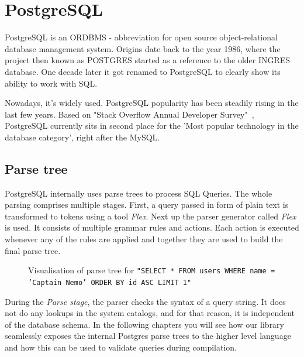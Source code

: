 \section{PostgreSQL}
PostgreSQL is an ORDBMS - abbreviation for open source object-relational database management system. Origins date back to the year 1986, where the project then known as POSTGRES started as a reference to the older INGRES database. One decade later it got renamed to PostgreSQL to clearly show its ability to work with SQL.\cite{PostgreSQL} 

Nowadays, it's widely used. PostgreSQL popularity has been steadily rising in the last few years. Based on "Stack Overflow Annual Developer Survey"~\cite{Stackoverflow survey}, PostgreSQL currently sits in second place for the 'Most popular technology in the database category', right after the MySQL.

\subsection{Parse tree}
PostgreSQL internally uses parse trees to process SQL Queries. The whole parsing comprises multiple stages. First, a query passed in form of plain text is transformed to tokens using a tool \textit{Flex}. Next up the parser generator called \textit{Flex} is used. It consists of multiple grammar rules and actions. Each action is executed whenever any of the rules are applied and together they are used to build the final parse tree.

\newpage

\begin{figure}[h]
  \caption {Visualisation of parse tree for \texttt{"SELECT * FROM users WHERE name = 'Captain Nemo' ORDER BY id ASC LIMIT 1"}}
\end{figure}

During the \textit{Parse stage}, the parser checks the syntax of a query string. It does not do any lookups in the system catalogs, and for that reason, it is independent of the database schema. In the following chapters you will see how our library seamlessly exposes the internal Postgres parse trees to the higher level language and how this can be used to validate queries during compilation.

